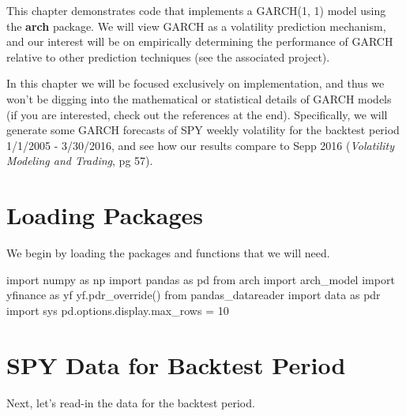 \documentclass[
  letterpaper,
  DIV=11,
  numbers=noendperiod]{scrreprt}
\newenvironment{Shaded}{\begin{snugshade}}{\end{snugshade}}
\newcommand{\DecValTok}[1]{\textcolor[rgb]{0.68,0.00,0.00}{#1}}
\newcommand{\ImportTok}[1]{\textcolor[rgb]{0.00,0.46,0.62}{#1}}
\newcommand{\NormalTok}[1]{\textcolor[rgb]{0.00,0.23,0.31}{#1}}
\newcommand{\OperatorTok}[1]{\textcolor[rgb]{0.37,0.37,0.37}{#1}}
\begin{document}
This chapter demonstrates code that implements a GARCH(1, 1) model using
the \textbf{arch} package. We will view GARCH as a volatility prediction
mechanism, and our interest will be on empirically determining the
performance of GARCH relative to other prediction techniques (see the
associated project).

In this chapter we will be focused exclusively on implementation, and
thus we won't be digging into the mathematical or statistical details of
GARCH models (if you are interested, check out the references at the
end). Specifically, we will generate some GARCH forecasts of SPY weekly
volatility for the backtest period 1/1/2005 - 3/30/2016, and see how our
results compare to Sepp 2016 (\emph{Volatility Modeling and Trading}, pg
57).

\hypertarget{loading-packages-9}{%
\section{Loading Packages}\label{loading-packages-9}}

We begin by loading the packages and functions that we will need.

\begin{Shaded}
\begin{Highlighting}[]
\ImportTok{import}\NormalTok{ numpy }\ImportTok{as}\NormalTok{ np}
\ImportTok{import}\NormalTok{ pandas }\ImportTok{as}\NormalTok{ pd}
\ImportTok{from}\NormalTok{ arch }\ImportTok{import}\NormalTok{ arch\_model}
\ImportTok{import}\NormalTok{ yfinance }\ImportTok{as}\NormalTok{ yf}
\NormalTok{yf.pdr\_override()}
\ImportTok{from}\NormalTok{ pandas\_datareader }\ImportTok{import}\NormalTok{ data }\ImportTok{as}\NormalTok{ pdr}
\ImportTok{import}\NormalTok{ sys}
\NormalTok{pd.options.display.max\_rows }\OperatorTok{=} \DecValTok{10}
\end{Highlighting}
\end{Shaded}

\hypertarget{spy-data-for-backtest-period}{%
\section{SPY Data for Backtest
Period}\label{spy-data-for-backtest-period}}

Next, let's read-in the data for the backtest period.
\end{document}

